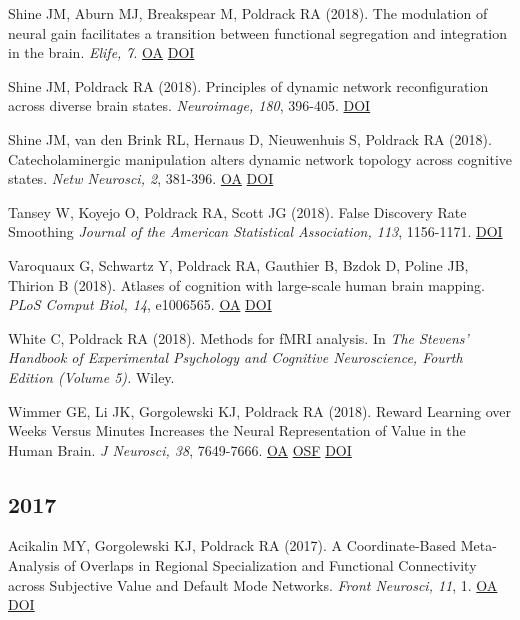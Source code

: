 \documentclass[10pt, letterpaper]{article}
\begin{document}
Shine JM, Aburn MJ, Breakspear M, Poldrack RA (2018). The modulation of neural gain facilitates a transition between functional segregation and integration in the brain. \textit{Elife, 7}. \href{https://www.ncbi.nlm.nih.gov/pmc/articles/PMC5818252}{OA} \href{http://dx.doi.org/10.7554/elife.31130}{DOI} \vspace{2mm}

Shine JM, Poldrack RA (2018). Principles of dynamic network reconfiguration across diverse brain states. \textit{Neuroimage, 180}, 396-405. \href{http://dx.doi.org/10.1016/j.neuroimage.2017.08.010}{DOI} \vspace{2mm}

Shine JM, van den Brink RL, Hernaus D, Nieuwenhuis S, Poldrack RA (2018). Catecholaminergic manipulation alters dynamic network topology across cognitive states. \textit{Netw Neurosci, 2}, 381-396. \href{https://www.ncbi.nlm.nih.gov/pmc/articles/PMC6145851}{OA} \href{http://dx.doi.org/10.1162/netn_a_00042}{DOI} \vspace{2mm}

Tansey W, Koyejo O, Poldrack RA, Scott JG (2018). False Discovery Rate Smoothing \textit{Journal of the American Statistical Association, 113}, 1156-1171. \href{http://dx.doi.org/10.1080/01621459.2017.1319838}{DOI} \vspace{2mm}

Varoquaux G, Schwartz Y, Poldrack RA, Gauthier B, Bzdok D, Poline JB, Thirion B (2018). Atlases of cognition with large-scale human brain mapping. \textit{PLoS Comput Biol, 14}, e1006565. \href{https://www.ncbi.nlm.nih.gov/pmc/articles/PMC6289578}{OA} \href{http://dx.doi.org/10.1371/journal.pcbi.1006565}{DOI} \vspace{2mm}

White C, Poldrack RA (2018). Methods for fMRI analysis. In \textit{The Stevens’ Handbook of Experimental Psychology and Cognitive Neuroscience, Fourth Edition (Volume 5).} Wiley. \vspace{2mm}

Wimmer GE, Li JK, Gorgolewski KJ, Poldrack RA (2018). Reward Learning over Weeks Versus Minutes Increases the Neural Representation of Value in the Human Brain. \textit{J Neurosci, 38}, 7649-7666. \href{https://www.ncbi.nlm.nih.gov/pmc/articles/PMC6113901}{OA} \href{https://osf.io/z2gwf/}{OSF} \href{http://dx.doi.org/10.1523/jneurosci.0075-18.2018}{DOI} \vspace{2mm}

\subsection*{2017}Acikalin MY, Gorgolewski KJ, Poldrack RA (2017). A Coordinate-Based Meta-Analysis of Overlaps in Regional Specialization and Functional Connectivity across Subjective Value and Default Mode Networks. \textit{Front Neurosci, 11}, 1. \href{https://www.ncbi.nlm.nih.gov/pmc/articles/PMC5243799}{OA} \href{http://dx.doi.org/10.3389/fnins.2017.00001}{DOI} \vspace{2mm}
\end{document}
